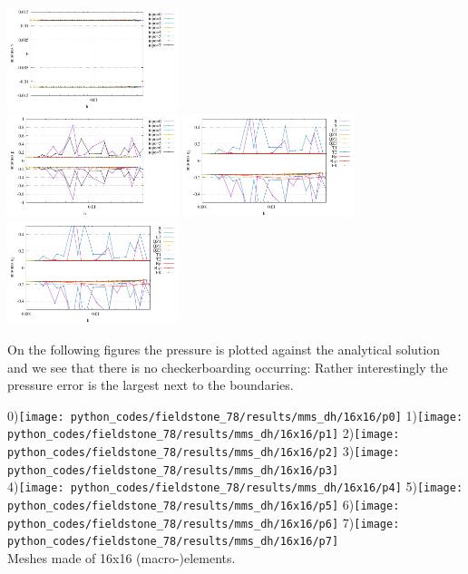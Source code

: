 \begin{center}
\includegraphics[width=5cm]{python_codes/fieldstone_78/results/stats_v_exp1.pdf}\\
\includegraphics[width=5cm]{python_codes/fieldstone_78/results/stats_p_exp1.pdf}
\includegraphics[width=5cm]{python_codes/fieldstone_78/results/stats_q1_exp1.pdf}
\includegraphics[width=5cm]{python_codes/fieldstone_78/results/stats_q2_exp1.pdf}
\end{center}

On the following figures the pressure is plotted against the analytical solution and 
we see that there is no checkerboarding occurring:
Rather interestingly the pressure error is the largest next to the boundaries.

\begin{center}
0)\texttt{[image: python\_codes/fieldstone\_78/results/mms\_dh/16x16/p0]}
1)\texttt{[image: python\_codes/fieldstone\_78/results/mms\_dh/16x16/p1]}
2)\texttt{[image: python\_codes/fieldstone\_78/results/mms\_dh/16x16/p2]}
3)\texttt{[image: python\_codes/fieldstone\_78/results/mms\_dh/16x16/p3]}\\
4)\texttt{[image: python\_codes/fieldstone\_78/results/mms\_dh/16x16/p4]}
5)\texttt{[image: python\_codes/fieldstone\_78/results/mms\_dh/16x16/p5]}
6)\texttt{[image: python\_codes/fieldstone\_78/results/mms\_dh/16x16/p6]}
7)\texttt{[image: python\_codes/fieldstone\_78/results/mms\_dh/16x16/p7]}\\
{\captionfont Meshes  made of 16x16 (macro-)elements.} 
\end{center}



